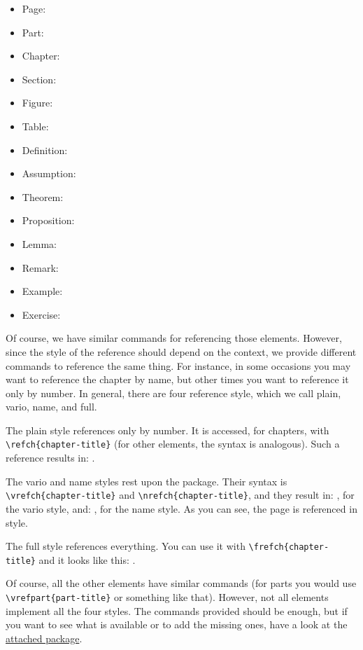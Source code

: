\begin{multicols}{2}
\setlength{\columnseprule}{0pt}
\begin{itemize}
	\item Page: 
	\item Part: 
	\item Chapter: 
	\item Section: 
	\item Figure: 
	\item Table: 
	\item Definition: 
	\item Assumption: 
	\item Theorem: 
	\item Proposition: 
	\item Lemma: 
	\item Remark: 
	\item Example: 
	\item Exercise: 
\end{itemize}
\end{multicols}

Of course, we have similar commands for referencing those elements.
However, since the style of the reference should depend on the context,
we provide different commands to reference the same thing. For instance,
in some occasions you may want to reference the chapter by name, but
other times you want to reference it only by number. In general, there
are four reference style, which we call plain, vario, name, and full.

The plain style references only by number. It is accessed, for chapters,
with \lstinline|\refch{chapter-title}| (for other elements, the syntax
is analogous). Such a reference results in: .

The vario and name styles rest upon the  package.
Their syntax is \lstinline|\vrefch{chapter-title}| and
\lstinline|\nrefch{chapter-title}|, and they result in:
, for the vario style, and: , for
the name style. As you can see, the page is referenced in
 style.

The full style references everything. You can use it with
\lstinline|\frefch{chapter-title}| and it looks like this:
.

Of course, all the other elements have similar commands (\eg for parts
you would use \lstinline|\vrefpart{part-title}| or something like that).
However, not all elements implement all the four styles. The commands
provided should be enough, but if you want to see what is available or
to add the missing ones, have a look at the
\href{styles/kaorefs.sty}{attached package}.

